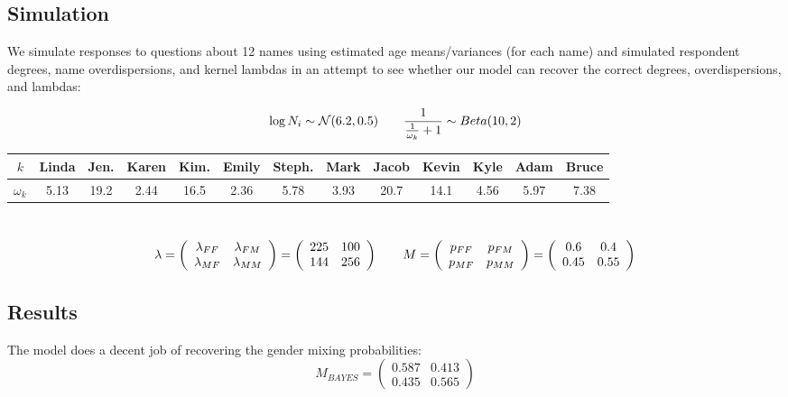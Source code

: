 \documentclass[12pt]{article}
\begin{document}
\subsection*{Simulation}
We simulate responses to questions about 12 names using estimated age means/variances (for each name) and simulated respondent degrees, name overdispersions, and kernel lambdas in an attempt to see whether our model can recover the correct degrees, overdispersions, and lambdas:

$$\log N_i \sim \mathcal{N}(6.2,0.5) \hspace{20 pt}  \frac{1}{ \frac{1}{\omega_k}+1} \sim Beta(10,2) 
$$

\noindent \begin{tabular}{c | cccccccccccc} 
$k$ & Linda & Jen. & Karen & Kim. & Emily & Steph. & Mark & Jacob & Kevin & Kyle & Adam & Bruce \\
\hline
$\omega_k$ & 5.13 & 19.2 & 2.44 & 16.5 & 2.36 & 5.78 & 3.93 & 20.7 & 14.1 & 4.56 & 5.97 & 7.38  \\
\end{tabular}\\

$$ \lambda
= \left( \begin{array}{cc} \lambda_{FF} & \lambda_{FM} \\
\lambda_{MF} & \lambda_{MM} \end{array} \right) 
= \left( \begin{array}{cc}
225 & 100 \\
144 & 256 \end{array} \right) 
\hspace{20 pt} M
= \left( \begin{array}{cc} p_{FF} & p_{FM} \\
p_{MF} & p_{MM} \end{array} \right) 
= \left( \begin{array}{cc}
0.6 & 0.4 \\
0.45 & 0.55 \end{array} \right)$$

\subsection*{Results}
The model does a decent job of recovering the gender mixing probabilities:
$$ M_{BAYES}
= \left( \begin{array}{cc}
0.587 & 0.413 \\
0.435 & 0.565 \end{array} \right) $$
\end{document}
